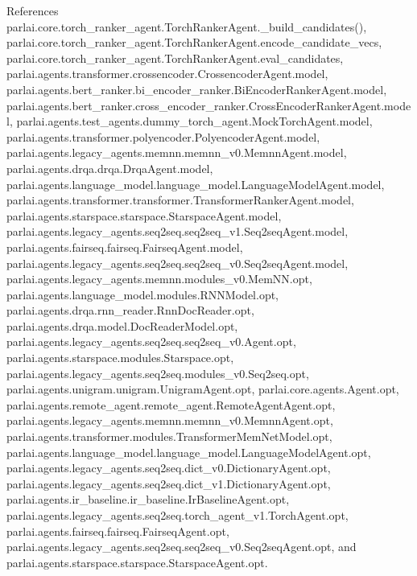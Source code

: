 References parlai.\+core.\+torch\+\_\+ranker\+\_\+agent.\+Torch\+Ranker\+Agent.\+\_\+build\+\_\+candidates(), parlai.\+core.\+torch\+\_\+ranker\+\_\+agent.\+Torch\+Ranker\+Agent.\+encode\+\_\+candidate\+\_\+vecs, parlai.\+core.\+torch\+\_\+ranker\+\_\+agent.\+Torch\+Ranker\+Agent.\+eval\+\_\+candidates, parlai.\+agents.\+transformer.\+crossencoder.\+Crossencoder\+Agent.\+model, parlai.\+agents.\+bert\+\_\+ranker.\+bi\+\_\+encoder\+\_\+ranker.\+Bi\+Encoder\+Ranker\+Agent.\+model, parlai.\+agents.\+bert\+\_\+ranker.\+cross\+\_\+encoder\+\_\+ranker.\+Cross\+Encoder\+Ranker\+Agent.\+model, parlai.\+agents.\+test\+\_\+agents.\+dummy\+\_\+torch\+\_\+agent.\+Mock\+Torch\+Agent.\+model, parlai.\+agents.\+transformer.\+polyencoder.\+Polyencoder\+Agent.\+model, parlai.\+agents.\+legacy\+\_\+agents.\+memnn.\+memnn\+\_\+v0.\+Memnn\+Agent.\+model, parlai.\+agents.\+drqa.\+drqa.\+Drqa\+Agent.\+model, parlai.\+agents.\+language\+\_\+model.\+language\+\_\+model.\+Language\+Model\+Agent.\+model, parlai.\+agents.\+transformer.\+transformer.\+Transformer\+Ranker\+Agent.\+model, parlai.\+agents.\+starspace.\+starspace.\+Starspace\+Agent.\+model, parlai.\+agents.\+legacy\+\_\+agents.\+seq2seq.\+seq2seq\+\_\+v1.\+Seq2seq\+Agent.\+model, parlai.\+agents.\+fairseq.\+fairseq.\+Fairseq\+Agent.\+model, parlai.\+agents.\+legacy\+\_\+agents.\+seq2seq.\+seq2seq\+\_\+v0.\+Seq2seq\+Agent.\+model, parlai.\+agents.\+legacy\+\_\+agents.\+memnn.\+modules\+\_\+v0.\+Mem\+N\+N.\+opt, parlai.\+agents.\+language\+\_\+model.\+modules.\+R\+N\+N\+Model.\+opt, parlai.\+agents.\+drqa.\+rnn\+\_\+reader.\+Rnn\+Doc\+Reader.\+opt, parlai.\+agents.\+drqa.\+model.\+Doc\+Reader\+Model.\+opt, parlai.\+agents.\+legacy\+\_\+agents.\+seq2seq.\+seq2seq\+\_\+v0.\+Agent.\+opt, parlai.\+agents.\+starspace.\+modules.\+Starspace.\+opt, parlai.\+agents.\+legacy\+\_\+agents.\+seq2seq.\+modules\+\_\+v0.\+Seq2seq.\+opt, parlai.\+agents.\+unigram.\+unigram.\+Unigram\+Agent.\+opt, parlai.\+core.\+agents.\+Agent.\+opt, parlai.\+agents.\+remote\+\_\+agent.\+remote\+\_\+agent.\+Remote\+Agent\+Agent.\+opt, parlai.\+agents.\+legacy\+\_\+agents.\+memnn.\+memnn\+\_\+v0.\+Memnn\+Agent.\+opt, parlai.\+agents.\+transformer.\+modules.\+Transformer\+Mem\+Net\+Model.\+opt, parlai.\+agents.\+language\+\_\+model.\+language\+\_\+model.\+Language\+Model\+Agent.\+opt, parlai.\+agents.\+legacy\+\_\+agents.\+seq2seq.\+dict\+\_\+v0.\+Dictionary\+Agent.\+opt, parlai.\+agents.\+legacy\+\_\+agents.\+seq2seq.\+dict\+\_\+v1.\+Dictionary\+Agent.\+opt, parlai.\+agents.\+ir\+\_\+baseline.\+ir\+\_\+baseline.\+Ir\+Baseline\+Agent.\+opt, parlai.\+agents.\+legacy\+\_\+agents.\+seq2seq.\+torch\+\_\+agent\+\_\+v1.\+Torch\+Agent.\+opt, parlai.\+agents.\+fairseq.\+fairseq.\+Fairseq\+Agent.\+opt, parlai.\+agents.\+legacy\+\_\+agents.\+seq2seq.\+seq2seq\+\_\+v0.\+Seq2seq\+Agent.\+opt, and parlai.\+agents.\+starspace.\+starspace.\+Starspace\+Agent.\+opt.



